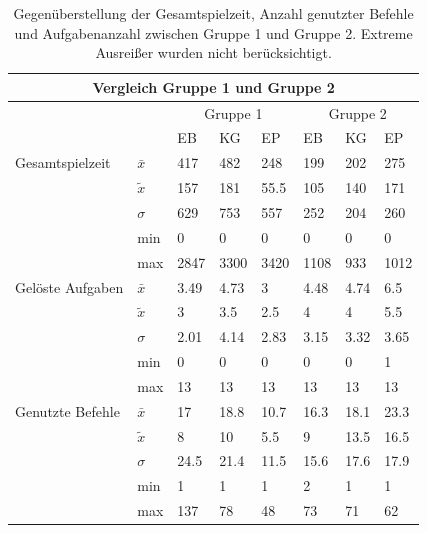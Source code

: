 \begin{table}[htbp]
\centering
\begin{tabular}{ p{3.5cm} | p{0.75cm} | p{1cm} p{1cm}  p{1cm} || p{1cm} p{1cm} p{1cm}}
 \hline
 \multicolumn{8}{c}{Vergleich Gruppe 1 und Gruppe 2} \\
 \hline
 & & \multicolumn{3}{c||}{Gruppe 1} & \multicolumn{3}{c}{Gruppe 2}\\
 & & EB & KG & EP & EB & KG & EP\\
 \hline
  Gesamtspielzeit   & $\bar{x}$     & 417   & 482   & 248   & 199  & 202  & 275   \\
                    & $\tilde{x}$   & 157   & 181   & 55.5  & 105  & 140  & 171   \\
                    & $\sigma$      & 629   & 753   & 557   & 252  & 204  & 260   \\
                    & min           & 0     & 0     & 0     & 0    & 0    & 0     \\
                    & max           & 2847  & 3300  & 3420  & 1108 & 933  & 1012  \\
 \hline
  Gelöste Aufgaben  & $\bar{x}$     & 3.49  & 4.73  & 3     & 4.48 & 4.74   & 6.5     \\
                    & $\tilde{x}$   & 3     & 3.5   & 2.5   & 4    & 4      & 5.5     \\
                    & $\sigma$      & 2.01  & 4.14  & 2.83  & 3.15 & 3.32   & 3.65     \\
                    & min           & 0     & 0     & 0     & 0    & 0      & 1     \\
                    & max           & 13    & 13    & 13    & 13   & 13     & 13     \\
  \hline
  Genutzte Befehle  & $\bar{x}$     & 17   & 18.8   & 10.7  & 16.3   & 18.1   & 23.3     \\
                    & $\tilde{x}$   & 8    & 10     & 5.5   & 9      & 13.5   & 16.5     \\
                    & $\sigma$      & 24.5 & 21.4   & 11.5  & 15.6   & 17.6   & 17.9     \\
                    & min           & 1    & 1      & 1     & 2      & 1      & 1     \\
                    & max           & 137  & 78     & 48    & 73     & 71     & 62     \\

  
 \hline
\end{tabular}
\caption{Gegenüberstellung der Gesamtspielzeit, Anzahl genutzter Befehle und Aufgabenanzahl zwischen Gruppe 1 und Gruppe 2. Extreme Ausreißer wurden nicht berücksichtigt.}
\label{final}
\end{table}


